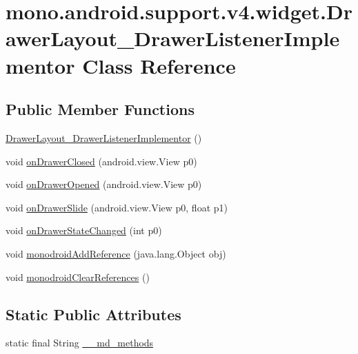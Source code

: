 \hypertarget{classmono_1_1android_1_1support_1_1v4_1_1widget_1_1_drawer_layout___drawer_listener_implementor}{
\section{mono.android.support.v4.widget.DrawerLayout\_\-DrawerListenerImplementor Class Reference}
\label{classmono_1_1android_1_1support_1_1v4_1_1widget_1_1_drawer_layout___drawer_listener_implementor}
}
\subsection*{Public Member Functions}
\begin{CompactItemize}
\item 
\hyperlink{classmono_1_1android_1_1support_1_1v4_1_1widget_1_1_drawer_layout___drawer_listener_implementor_101c2a05006b66619d39e7052699f74b}{DrawerLayout\_\-DrawerListenerImplementor} ()
\item 
void \hyperlink{classmono_1_1android_1_1support_1_1v4_1_1widget_1_1_drawer_layout___drawer_listener_implementor_19da95bb5c1e94a6af928960ad0ed455}{onDrawerClosed} (android.view.View p0)
\item 
void \hyperlink{classmono_1_1android_1_1support_1_1v4_1_1widget_1_1_drawer_layout___drawer_listener_implementor_fca9c99baf632ae1efb1836cb29da6f4}{onDrawerOpened} (android.view.View p0)
\item 
void \hyperlink{classmono_1_1android_1_1support_1_1v4_1_1widget_1_1_drawer_layout___drawer_listener_implementor_9895b1e0ad123b4ba0bf63c1daa47da1}{onDrawerSlide} (android.view.View p0, float p1)
\item 
void \hyperlink{classmono_1_1android_1_1support_1_1v4_1_1widget_1_1_drawer_layout___drawer_listener_implementor_d64490c0905c975d11975cd9c73a37a5}{onDrawerStateChanged} (int p0)
\item 
void \hyperlink{classmono_1_1android_1_1support_1_1v4_1_1widget_1_1_drawer_layout___drawer_listener_implementor_b223e0c04fc076ef1a6e6bd5edf64e9b}{monodroidAddReference} (java.lang.Object obj)
\item 
void \hyperlink{classmono_1_1android_1_1support_1_1v4_1_1widget_1_1_drawer_layout___drawer_listener_implementor_d993dda0d0a5b7ea3f37e9200a1fd359}{monodroidClearReferences} ()
\end{CompactItemize}
\subsection*{Static Public Attributes}
\begin{CompactItemize}
\item 
static final String \hyperlink{classmono_1_1android_1_1support_1_1v4_1_1widget_1_1_drawer_layout___drawer_listener_implementor_7a043c89da462068f6a987eb0eaaf8f3}{\_\-\_\-md\_\-methods}
\end{CompactItemize}
